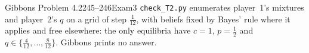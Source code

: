 \begin{exsol}{Gibbons Problem 4.2}{245--246}{Exam}{3}
\verify \texttt{check\_T2.py} enumerates player~1's mixtures and player~2's $q$ on a grid of step
$\frac1{12}$, with beliefs fixed by Bayes' rule where it applies and free elsewhere: the only equilibria
have $c = 1$, $p = \frac12$ and $q \in \{\frac4{12}, \dots, \frac8{12}\}$. Gibbons prints no answer.

\end{exsol}

